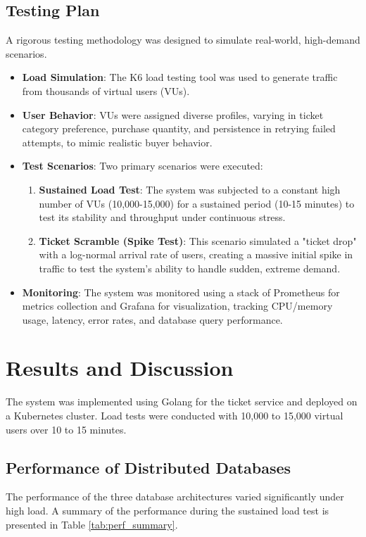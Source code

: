 \documentclass{ieeeaccess}
\begin{document}
\subsection{Testing Plan}
A rigorous testing methodology was designed to simulate real-world, high-demand scenarios.
\begin{itemize}
\item \textbf{Load Simulation}: The K6 load testing tool was used to generate traffic from thousands of virtual users (VUs).
\item \textbf{User Behavior}: VUs were assigned diverse profiles, varying in ticket category preference, purchase quantity, and persistence in retrying failed attempts, to mimic realistic buyer behavior.
\item \textbf{Test Scenarios}: Two primary scenarios were executed:
\begin{enumerate}
\item \textbf{Sustained Load Test}: The system was subjected to a constant high number of VUs (10,000-15,000) for a sustained period (10-15 minutes) to test its stability and throughput under continuous stress.
\item \textbf{Ticket Scramble (Spike Test)}: This scenario simulated a "ticket drop" with a log-normal arrival rate of users, creating a massive initial spike in traffic to test the system's ability to handle sudden, extreme demand.
\end{enumerate}
\item \textbf{Monitoring}: The system was monitored using a stack of Prometheus for metrics collection and Grafana for visualization, tracking CPU/memory usage, latency, error rates, and database query performance.
\end{itemize}

\section{Results and Discussion}
\label{sec:results}
The system was implemented using Golang for the ticket service and deployed on a Kubernetes cluster. Load tests were conducted with 10,000 to 15,000 virtual users over 10 to 15 minutes.

\subsection{Performance of Distributed Databases}
The performance of the three database architectures varied significantly under high load. A summary of the performance during the sustained load test is presented in Table \ref{tab:perf_summary}.
\end{document}
